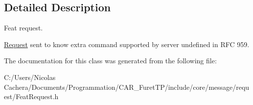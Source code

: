\subsection{Detailed Description}
Feat request. 

\hyperlink{classFTP_1_1Request}{Request} sent to know extra command supported by server undefined in R\+F\+C 959. 

The documentation for this class was generated from the following file\+:\begin{DoxyCompactItemize}
\item 
C\+:/\+Users/\+Nicolas Cachera/\+Documents/\+Programmation/\+C\+A\+R\+\_\+\+Furet\+T\+P/include/core/message/request/Feat\+Request.\+h\end{DoxyCompactItemize}
